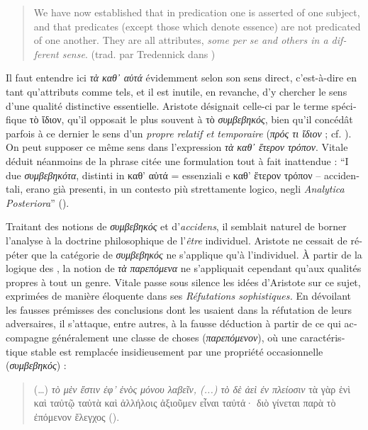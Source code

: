 \documentclass[french,output=paper,colorlinks,citecolor=brown]{../langscibook}
\begin{document}
\begin{otherlanguage}{french}
\begin{quote}
    We have now established that in predication one is asserted of one subject, and that predicates (except those which denote essence) are not predicated of one another. They are all attributes, \textit{some per se and others in a different sense}. (trad. par Tredennick dans )
\end{quote}

Il faut entendre ici \textit{τὰ καθ᾿ αὑτά} évidemment selon son sens direct, c’est-à-dire en tant qu’attributs comme tels, et il est inutile, en revanche, d’y chercher le sens d’une qualité distinctive essentielle. Aristote désignait celle-ci par le terme spécifique τὸ ἴδιον, qu’il opposait le plus souvent à τὸ \textit{συμβεβηκός}, bien qu’il concédât parfois à ce dernier le sens d’un \textit{propre relatif et temporaire} (\textit{πρός τι ἴδιον} ; cf. ). On peut supposer ce même sens dans l’expression \textit{τὰ καθ᾿ ἕτερον τρόπον}. Vitale déduit néanmoins de la phrase citée une formulation tout à fait inattendue : “I due \textit{συμβεβηκότα}, distinti in καθ’ αὑτά  = essenziali e καθ’ ἕτερον τρόπον – accidentali, erano già presenti, in un contesto più strettamente logico, negli \textit{Analytica Posteriora}” (\citealt[202]{Vitale1982}).

Traitant des notions de \textit{συμβεβηκός} et d’\textit{accidens}, il semblait naturel de borner l’analyse à la doctrine philosophique de l’\textit{être} individuel. Aristote ne cessait de répéter que la catégorie de \textit{συμβεβηκός} ne s’applique qu’à l’individuel. À partir de la logique des , la notion de \textit{τὰ} \textit{παρεπόμενα} ne s’appliquait cependant qu’aux qualités propres à tout un genre. Vitale passe sous silence les idées d’Aristote sur ce sujet, exprimées de manière éloquente dans ses \textit{Réfutations sophistiques.} En dévoilant les fausses prémisses des conclusions dont les  usaient dans la réfutation de leurs adversaires, il s’attaque, entre autres, à la fausse déduction à partir de ce qui accompagne généralement une classe de choses (\textit{παρεπόμενον}), où une caractéristique stable est remplacée insidieusement par une propriété occasionnelle (\textit{συμβεβηκός}) :

\begin{quote}
    
(…) \textit{τὸ μὲν  ἔστιν ἐφ’ ἑνὸς μόνου λαβεῖν, (...) τὸ δὲ  ἀεὶ ἐν πλείοσιν} τὰ γὰρ ἑνὶ καὶ ταὐτῷ ταὐτὰ καὶ ἀλλήλοις ἀξιοῦμεν εἶναι ταὐτά· διὸ γίνεται παρὰ τὸ ἐπόμενον ἔλεγχος ().


\end{quote}
\end{otherlanguage}
\end{document}
